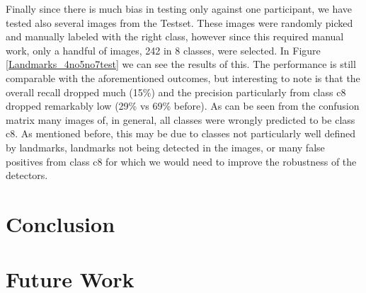 \documentclass[10pt,twocolumn,letterpaper]{article}
\begin{document}
Finally since there is much bias in testing only against one participant, we have tested also several images from the Testset. These images were randomly picked and manually labeled with the right class, however since this required manual work, only a handful of images, 242 in 8 classes, were selected. In Figure \ref{Landmarks_4no5no7test} we can see the results of this. The performance is still comparable with the aforementioned outcomes, but interesting to note is that the overall recall dropped much (15\%) and the precision particularly from class c8 dropped remarkably low (29\% vs 69\% before). As can be seen from the confusion matrix many images of, in general, all classes were wrongly predicted to be class c8. As mentioned before, this may be due to classes not particularly well defined by landmarks, landmarks not being detected in the images, or many false positives from class c8 for which we would need to improve the robustness of the detectors.

\section{Conclusion}

\section{Future Work}




{\small


}
\end{document}
